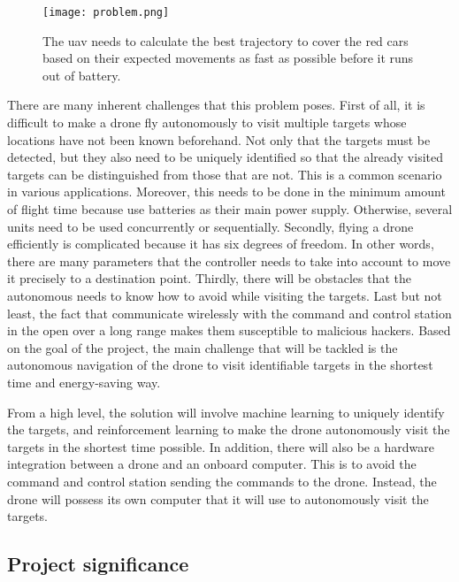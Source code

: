 \documentclass[../main.tex]{subfiles}
\begin{document}
\begin{figure}[tb] 
    \centering
    \texttt{[image: problem.png]} 
    \caption{The \gls{uav} needs to calculate 
    the best trajectory to cover the red cars
    based on their expected movements
    as fast as possible before it runs out of battery.} 
    \label{fig:problem} 
\end{figure}

There are many inherent challenges that this problem
poses. First of all, it is difficult to make a drone
fly autonomously to visit multiple targets whose locations
have not been known beforehand. 
Not only that the targets must be detected, 
but they also need to be uniquely
identified so that the already visited targets
can be distinguished from those that are not.
This is a common scenario in various applications. 
Moreover, this needs to be done in the minimum
amount of flight time because \uavs use batteries
as their main power supply.
Otherwise, several units need to be used concurrently
or sequentially.
Secondly, flying a drone efficiently is complicated 
because it has six degrees of freedom. In other words, 
there are many parameters that the controller needs to 
take into account to move 
it precisely to a destination point. 
Thirdly, there will be obstacles that the autonomous \uav
needs to know how to avoid while visiting the targets.
Last but not least, the fact that \uavs communicate wirelessly
with the command and control station in the open 
over a long range makes them susceptible
to malicious hackers.
Based on the goal of the project, the main challenge 
that will be tackled is the autonomous navigation
of the drone to visit identifiable targets in the shortest
time and energy-saving way.

From a high level, the solution will involve machine learning
to uniquely identify the targets, and reinforcement learning
to make the drone autonomously visit the targets in the
shortest time possible. In addition, there will also be
a hardware integration between a drone and an onboard
computer. This is to avoid the command and control
station sending the commands to the drone. Instead, the drone
will possess its own computer that it will use to 
autonomously visit the targets.

\subsection{Project significance}
\end{document}
